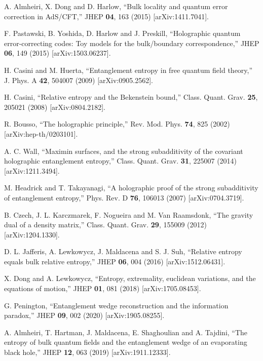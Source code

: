 \documentclass[11pt,letterpaper]{article}
\begin{document}
\begin{thebibliography}{99}
A. Almheiri, X. Dong and D. Harlow, ``Bulk locality and quantum error correction in AdS/CFT,''
JHEP \textbf{04}, 163 (2015) [arXiv:1411.7041].

F. Pastawski, B. Yoshida, D. Harlow and J. Preskill, ``Holographic quantum error-correcting codes: Toy models for the bulk/boundary correspondence,''
JHEP \textbf{06}, 149 (2015) [arXiv:1503.06237].

H. Casini and M. Huerta, ``Entanglement entropy in free quantum field theory,''
J. Phys. A \textbf{42}, 504007 (2009) [arXiv:0905.2562].

H. Casini, ``Relative entropy and the Bekenstein bound,''
Class. Quant. Grav. \textbf{25}, 205021 (2008) [arXiv:0804.2182].

R. Bousso, ``The holographic principle,''
Rev. Mod. Phys. \textbf{74}, 825 (2002) [arXiv:hep-th/0203101].

A. C. Wall, ``Maximin surfaces, and the strong subadditivity of the covariant holographic entanglement entropy,''
Class. Quant. Grav. \textbf{31}, 225007 (2014) [arXiv:1211.3494].

M. Headrick and T. Takayanagi, ``A holographic proof of the strong subadditivity of entanglement entropy,''
Phys. Rev. D \textbf{76}, 106013 (2007) [arXiv:0704.3719].

B. Czech, J. L. Karczmarek, F. Nogueira and M. Van Raamsdonk, ``The gravity dual of a density matrix,''
Class. Quant. Grav. \textbf{29}, 155009 (2012) [arXiv:1204.1330].

D. L. Jafferis, A. Lewkowycz, J. Maldacena and S. J. Suh, ``Relative entropy equals bulk relative entropy,''
JHEP \textbf{06}, 004 (2016) [arXiv:1512.06431].

X. Dong and A. Lewkowycz, ``Entropy, extremality, euclidean variations, and the equations of motion,''
JHEP \textbf{01}, 081 (2018) [arXiv:1705.08453].

G. Penington, ``Entanglement wedge reconstruction and the information paradox,''
JHEP \textbf{09}, 002 (2020) [arXiv:1905.08255].

A. Almheiri, T. Hartman, J. Maldacena, E. Shaghoulian and A. Tajdini, ``The entropy of bulk quantum fields and the entanglement wedge of an evaporating black hole,''
JHEP \textbf{12}, 063 (2019) [arXiv:1911.12333].


\end{thebibliography}
\end{document}
